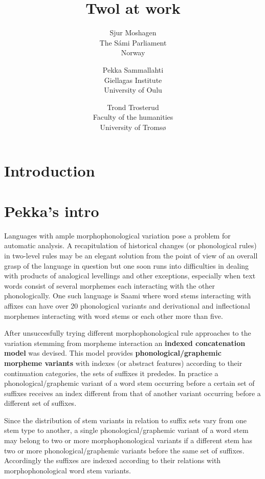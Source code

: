 \documentclass[a4paper,english]{article}
\begin{document}
\title{Twol at work}

\author{Sjur Moshagen\\The Sámi Parliament\\Norway
\and Pekka Sammallahti\\ Giellagas Institute\\University of Oulu
\and Trond Trosterud\\Faculty of the humanities\\University of Tromsø}


\maketitle

\tableofcontents

\section{Introduction}


\section{Pekka's intro}
Languages with ample morphophonological variation pose a problem for automatic analysis. A recapitulation of historical changes (or phonological rules) in two-level rules may be an elegant solution from the point of view of an overall grasp of the language in question but one soon runs into difficulties in dealing with products of analogical levellings and other exceptions, especially when text words consist of several morphemes each interacting with the other phonologically. One such language is Saami where word stems interacting with affixes can have over 20 phonological variants and derivational and inflectional morphemes interacting with word stems or each other more than five. 

After unsuccesfully trying different morphophonological rule approaches to the variation stemming from morpheme interaction an \textbf{indexed concatenation model} was devised. This model provides \textbf{phonological/graphemic morpheme variants} with indexes (or abstract features) according to their continuation categories, the sets of suffixes it prededes. In practice a phonological/graphemic variant of a word stem occurring before a certain set of suffixes receives an index different from that of another variant occurring before a different set of suffixes. 

Since the distribution of stem variants in relation to suffix sets vary from one stem type to another, a single phonological/graphemic variant of a word stem may belong to two or more morphophonological variants if a different stem has two or more phonological/graphemic variants before the same set of suffixes. Accordingly the suffixes are indexed according to their relations with morphophonological word stem variants. 
\end{document}
